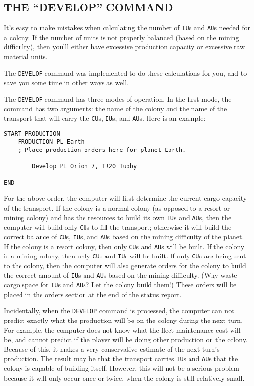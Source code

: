 \documentclass[10pt,titlepage]{article}
\begin{document}
\subsection{THE ``DEVELOP'' COMMAND}
\label{sec:developcommand}


It's easy to make mistakes when calculating the number of \texttt{IU}s and \texttt{AU}s needed
for a colony.  If the number of units is not properly balanced (based on the
mining difficulty), then you'll either have excessive production capacity or
excessive raw material units.

The \texttt{DEVELOP} command was implemented to do these calculations for you, and to
save you some time in other ways as well.

The \texttt{DEVELOP} command has three modes of operation.  In the first mode, the
command has two arguments: the name of the colony and the name of the transport
that will carry the \texttt{CU}s, \texttt{IU}s, and \texttt{AU}s.  Here is an example:

\begin{verbatim}
START PRODUCTION
    PRODUCTION PL Earth
    ; Place production orders here for planet Earth.

        Develop PL Orion 7, TR20 Tubby

END\end{verbatim} 


For the above order, the computer will first determine the current cargo
capacity of the transport.  If the colony is a normal colony (as opposed to a
resort or mining colony) and has the resources to build its own \texttt{IU}s and \texttt{AU}s,
then the computer will build only \texttt{CU}s to fill the transport; otherwise it will
build the correct balance of \texttt{CU}s, \texttt{IU}s, and \texttt{AU}s based on the mining difficulty
of the planet.  If the colony is a resort colony, then only \texttt{CU}s and \texttt{AU}s will be
built.  If the colony is a mining colony, then only \texttt{CU}s and \texttt{IU}s will be built.
If only \texttt{CU}s are being sent to the colony, then the computer will also generate
orders for the colony to build the correct amount of \texttt{IU}s and \texttt{AU}s based on the
mining difficulty.  (Why waste cargo space for \texttt{IU}s and \texttt{AU}s?  Let the colony
build them!)  These orders will be placed in the orders section at the end
of the status report.

\begin{informationnote}
Incidentally, when the \texttt{DEVELOP} command is processed, the computer can not
predict exactly what the production will be on the colony during the next turn.
For example, the computer does not know what the fleet maintenance cost will
be, and cannot predict if the player will be doing other production on the
colony.  Because of this, it makes a very conservative estimate of the next
turn's production.  The result may be that the transport carries \texttt{IU}s and \texttt{AU}s
that the colony is capable of building itself.  However, this will not be a
serious problem because it will only occur once or twice, when the colony is
still relatively small.
\end{informationnote}
\end{document}
